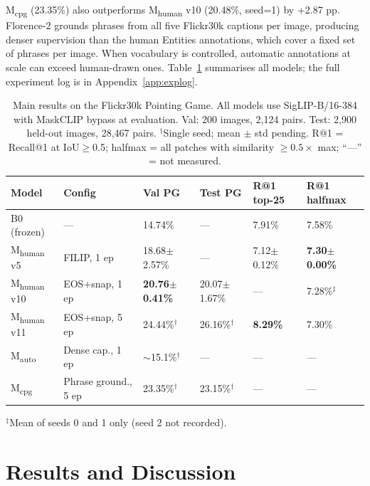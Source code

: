 \documentclass{article}
\begin{document}
M\textsubscript{cpg} (23.35\%) also outperforms M\textsubscript{human} v10
(20.48\%, seed=1) by +2.87 pp. Florence-2 grounds phrases from all five
Flickr30k captions per image, producing denser supervision than the human
Entities annotations, which cover a fixed set of phrases per image. When
vocabulary is controlled, automatic annotations at scale can exceed human-drawn
ones. Table~\ref{tab:main} summarises all models; the full experiment log is in
Appendix~\ref{app:explog}.

\begin{table}[H]
\centering
\caption{Main results on the Flickr30k Pointing Game. All models use
SigLIP-B/16-384 with MaskCLIP bypass at evaluation. Val: 200 images, 2,124
pairs. Test: 2,900 held-out images, 28,467 pairs. $^\dagger$Single seed;
mean $\pm$ std pending. R@1 = Recall@1 at IoU$\geq$0.5; halfmax = all
patches with similarity $\geq 0.5 \times$ max; ``---'' = not measured.}
\label{tab:main}
\setlength{\tabcolsep}{4pt}
\begin{tabular}{llllll}
\toprule
Model & Config & Val PG & Test PG & R@1 top-25 & R@1 halfmax \\
\midrule
B0 (frozen) & — & 14.74\% & --- & 7.91\% & 7.58\% \\
\midrule
M\textsubscript{human} v5  & FILIP, 1 ep        & 18.68$\pm$2.57\% & ---               & 7.12$\pm$0.12\% & \textbf{7.30$\pm$0.00\%} \\
M\textsubscript{human} v10 & EOS+snap, 1 ep     & \textbf{20.76$\pm$0.41\%} & 20.07$\pm$1.67\% & ---      & 7.28\%$^\ddagger$ \\
M\textsubscript{human} v11 & EOS+snap, 5 ep     & 24.44\%$^\dagger$ & 26.16\%$^\dagger$ & \textbf{8.29\%} & 7.30\% \\
\midrule
M\textsubscript{auto}      & Dense cap., 1 ep   & $\sim$15.1\%$^\dagger$ & ---          & ---             & --- \\
M\textsubscript{cpg}       & Phrase ground., 5 ep & 23.35\%$^\dagger$ & 23.15\%$^\dagger$ & ---           & --- \\
\bottomrule
\end{tabular}
{\small $^\ddagger$Mean of seeds 0 and 1 only (seed 2 not recorded).}
\end{table}

\section{Results and Discussion}
\label{sec:results}
\end{document}

